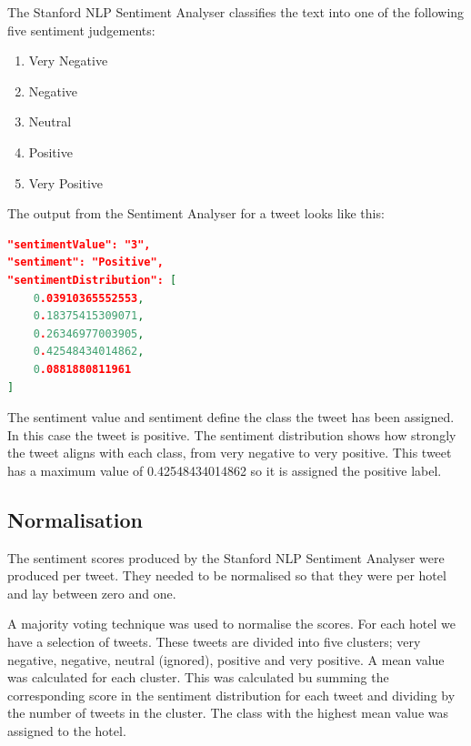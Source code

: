 
The Stanford NLP Sentiment Analyser classifies the text into one of the following five sentiment judgements: 
\begin{enumerate}
    \item Very Negative
    \item Negative
    \item Neutral
    \item Positive
    \item Very Positive
\end{enumerate}

The output from the Sentiment Analyser for a tweet looks like this:

\begin{lstlisting}[caption={Output from Stanford NLP Sentiment Analyser},
captionpos=b,label=lst:stanfordoutput,language=json,firstnumber=1]
"sentimentValue": "3",
"sentiment": "Positive",
"sentimentDistribution": [
    0.03910365552553,
    0.18375415309071,
    0.26346977003905,
    0.42548434014862,
    0.0881880811961
]
\end{lstlisting}

The sentiment value and sentiment define the class the tweet has been assigned. In this case the tweet is positive. The sentiment distribution shows how strongly the tweet aligns with each class, from very negative to very positive. This tweet has a maximum value of 0.42548434014862 so it is assigned the positive label.

\subsection*{Normalisation}

The sentiment scores produced by the Stanford NLP Sentiment Analyser were produced per tweet. They needed to be normalised so that they were per hotel and lay between zero and one.

A majority voting technique was used to normalise the scores. For each hotel we have a selection of tweets. These tweets are divided into five clusters; very negative, negative, neutral (ignored), positive and very positive. A mean value was calculated for each cluster. This was calculated bu summing the corresponding score in the sentiment distribution for each tweet and dividing by the number of tweets in the cluster. The class with the highest mean value was assigned to the hotel.

